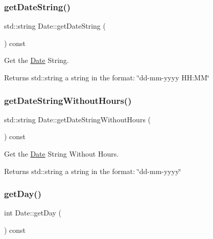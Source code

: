 \subsubsection{\texorpdfstring{get\+Date\+String()}{getDateString()}}
{\footnotesize\ttfamily std\+::string Date\+::get\+Date\+String (\begin{DoxyParamCaption}{ }\end{DoxyParamCaption}) const}



Get the \mbox{\hyperlink{classDate}{Date}} String. 

\begin{DoxyReturn}{Returns}
std\+::string a string in the format\+: \char`\"{}dd-\/mm-\/yyyy H\+H\+:\+M\+M\char`\"{} 
\end{DoxyReturn}
\mbox{\label{classDate_a54b53336c8ba897fae4d2bbb0aa84a99}} 
\subsubsection{\texorpdfstring{get\+Date\+String\+Without\+Hours()}{getDateStringWithoutHours()}}
{\footnotesize\ttfamily std\+::string Date\+::get\+Date\+String\+Without\+Hours (\begin{DoxyParamCaption}{ }\end{DoxyParamCaption}) const}



Get the \mbox{\hyperlink{classDate}{Date}} String Without Hours. 

\begin{DoxyReturn}{Returns}
std\+::string a string in the format\+: \char`\"{}dd-\/mm-\/yyyy\char`\"{} 
\end{DoxyReturn}
\mbox{\label{classDate_a0f253815240e70f4c39cb93cc68bd3f4}} 
\subsubsection{\texorpdfstring{get\+Day()}{getDay()}}
{\footnotesize\ttfamily int Date\+::get\+Day (\begin{DoxyParamCaption}{ }\end{DoxyParamCaption}) const}



